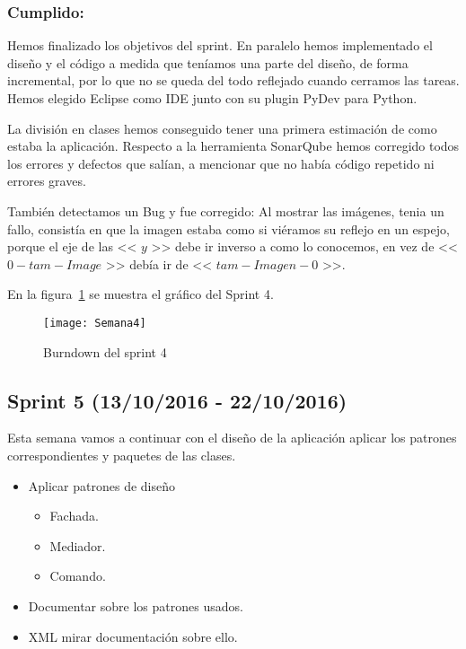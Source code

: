 \subsubsection{Cumplido:}
Hemos finalizado los objetivos del sprint.
En paralelo hemos implementado el diseño y el código a medida que teníamos una parte del diseño, de forma incremental, por lo que no se queda del todo reflejado cuando cerramos las tareas.\\

Hemos elegido Eclipse como IDE junto con su plugin PyDev para Python.

La división en clases hemos conseguido tener una primera estimación de como estaba la aplicación.
Respecto a la herramienta SonarQube hemos corregido todos los errores y defectos que salían, a mencionar que no había código repetido ni errores graves.

También detectamos un Bug y fue corregido:
Al mostrar las imágenes, tenia un fallo, consistía en que la imagen estaba como si viéramos su reflejo en un espejo, porque el eje de las << $y$ >> debe ir inverso a como lo conocemos, en vez de << $0-tam-Image$ >> debía ir de << $tam-Imagen-0$ >>.

En la figura~\ref{fig:A.2.4} se muestra el gráfico del Sprint 4.

\begin{figure}[h]
\centering
\texttt{[image: Semana4]}
\caption{Burndown del sprint 4}
\label{fig:A.2.4}
\end{figure}

\subsection{Sprint 5 (13/10/2016 - 22/10/2016)}
Esta semana vamos a continuar con el diseño de la aplicación aplicar los patrones correspondientes y paquetes de las clases.

\begin{itemize}
	\item Aplicar patrones de diseño
	\begin{itemize}
		\item Fachada.
		\item Mediador.
		\item Comando.
	\end{itemize}
	\item Documentar sobre los patrones usados.
	\item XML mirar documentación sobre ello.
\end{itemize}
